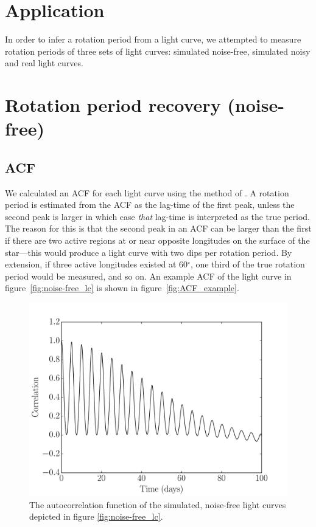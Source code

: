 \section{Application}

In order to infer a rotation period from a light curve, we attempted to
measure rotation periods of three sets of light curves: simulated noise-free,
simulated noisy and real light curves.

\section{Rotation period recovery (noise-free)}

\subsection{ACF}

We calculated an ACF for each light curve using the method of
\citet{mcquillan13}.
A rotation period is estimated from the ACF as the lag-time of the first peak,
unless the second peak is larger in which case {\it that} lag-time is
interpreted as the true period.
The reason for this is that the second peak in an ACF can be larger than the
first if there are two active regions at or near opposite longitudes on the
surface of the star---this would produce a light curve with two dips per
rotation period.
By extension, if three active longitudes existed at 60$^\circ$, one third of
the true rotation period would be measured, and so on.
An example ACF of the light curve in figure~\ref{fig:noise-free_lc} is shown
in figure~\ref{fig:ACF_example}.

\begin{figure}
\begin{center}
\includegraphics[width=6in, clip=true]{figures/noise-free_acf.pdf}
\caption{The autocorrelation function of the simulated, noise-free light
curves depicted in figure \ref{fig:noise-free_lc}.}
\end{center}
\end{figure}
\label{fig:compare_noise_free}

